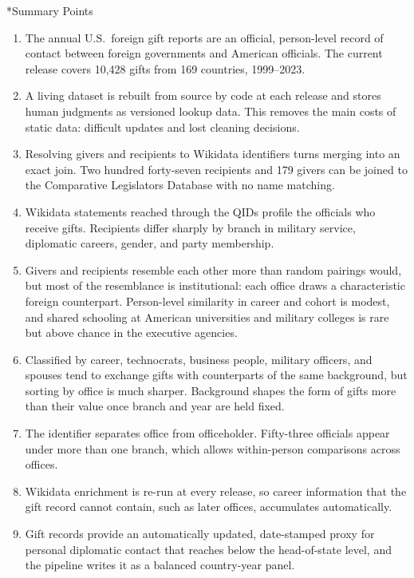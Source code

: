 \documentclass[11pt]{article}
\makeatletter
\renewcommand\section{\@startsection{section}{1}{\z@}{-3.0ex plus -1ex minus -.2ex}{1.5ex plus .2ex}{\normalfont\large\bfseries\MakeUppercase}}
\newcommand{\ngifts}{10,428}
\makeatother
\begin{document}
\section*{Summary Points}
\begin{enumerate}
\item The annual U.S.\ foreign gift reports are an official, person-level record of contact between foreign governments and American officials. The current release covers \ngifts{} gifts from 169 countries, 1999--2023.
\item A living dataset is rebuilt from source by code at each release and stores human judgments as versioned lookup data. This removes the main costs of static data: difficult updates and lost cleaning decisions.
\item Resolving givers and recipients to Wikidata identifiers turns merging into an exact join. Two hundred forty-seven recipients and 179 givers can be joined to the Comparative Legislators Database with no name matching.
\item Wikidata statements reached through the QIDs profile the officials who receive gifts. Recipients differ sharply by branch in military service, diplomatic careers, gender, and party membership.
\item Givers and recipients resemble each other more than random pairings would, but most of the resemblance is institutional: each office draws a characteristic foreign counterpart. Person-level similarity in career and cohort is modest, and shared schooling at American universities and military colleges is rare but above chance in the executive agencies.
\item Classified by career, technocrats, business people, military officers, and spouses tend to exchange gifts with counterparts of the same background, but sorting by office is much sharper. Background shapes the form of gifts more than their value once branch and year are held fixed.
\item The identifier separates office from officeholder. Fifty-three officials appear under more than one branch, which allows within-person comparisons across offices.
\item Wikidata enrichment is re-run at every release, so career information that the gift record cannot contain, such as later offices, accumulates automatically.
\item Gift records provide an automatically updated, date-stamped proxy for personal diplomatic contact that reaches below the head-of-state level, and the pipeline writes it as a balanced country-year panel.
\end{enumerate}
\end{document}
